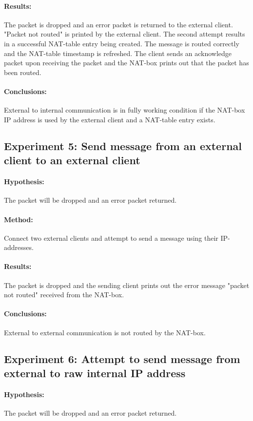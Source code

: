 \documentclass[12pt, a4paper]{article}
\begin{document}
\paragraph{Results:}
The packet is dropped and an error packet is returned to the external client. "Packet not routed" is printed by the external client. The second attempt results in a successful NAT-table entry being created. The message is routed correctly and the NAT-table timestamp is refreshed. The client sends an acknowledge packet upon receiving the packet and the NAT-box prints out that the packet has been routed.
\paragraph{Conclusions:}
External to internal communication is in fully working condition if the NAT-box IP address is used by the external client and a NAT-table entry exists.

\subsection{Experiment 5: Send message from an external client to an external client}
\paragraph{Hypothesis:}
The packet will be dropped and an error packet returned.
\paragraph{Method:}
Connect two external clients and attempt to send a message using their IP-addresses.
\paragraph{Results:}
The packet is dropped and the sending client prints out the error message "packet not routed" received from the NAT-box.
\paragraph{Conclusions:}
External to external communication is not routed by the NAT-box.

\subsection{Experiment 6: Attempt to send message from external to raw internal IP address}
\paragraph{Hypothesis:}
The packet will be dropped and an error packet returned.
\end{document}
